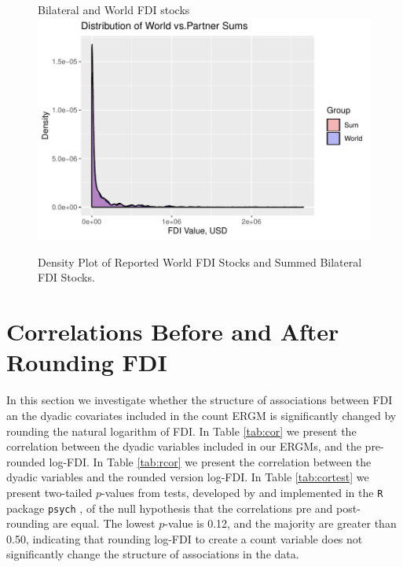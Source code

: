 \documentclass[reqno,onecolumn,letterpaper,12pt]{article}
\newcommand{\R}{\texttt{R}} %
\begin{document}
\begin{figure}[!h]
\centering
Bilateral and World FDI stocks\\
\includegraphics[height=.4\textheight, clip=true, trim=0cm 0cm 0cm .6cm]{SI_figures/descriptive_plots/check_sums.pdf} \vspace{0cm}
\caption{\label{fig:flows} Density Plot of Reported World FDI Stocks and Summed Bilateral FDI Stocks.}
\end{figure}







\section{Correlations Before and After Rounding FDI}

In this section we investigate whether the structure of associations between FDI an the dyadic covariates included in the count ERGM is significantly changed by rounding the natural logarithm of FDI. In Table \ref{tab:cor} we present the correlation between the dyadic variables included in our ERGMs, and the pre-rounded log-FDI. In Table \ref{tab:rcor} we present the correlation between the dyadic variables and the rounded version log-FDI. In Table \ref{tab:cortest} we present two-tailed $p$-values from tests, developed by \cite{dunn1969correlation} and implemented in the \R~ package \texttt{psych} \citep{psych}, of the null hypothesis that the correlations pre and post-rounding are equal. The lowest $p$-value is 0.12, and the majority are greater than 0.50, indicating that rounding log-FDI to create a count variable does not significantly change the structure of associations in the data.
\end{document}
